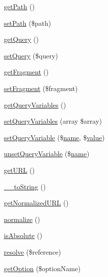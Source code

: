 \begin{DoxyCompactItemize}
\item 
\hyperlink{classNet__URL2_a1c14da4e4da398c69ab0efcc80b183d2}{get\+Path} ()
\item 
\hyperlink{classNet__URL2_aa893e3c250be4842cf21dc6aed0f46b0}{set\+Path} (\$path)
\item 
\hyperlink{classNet__URL2_ab65997a75dae3ef237c80b57da4467f6}{get\+Query} ()
\item 
\hyperlink{classNet__URL2_a8ef0c4583fcbc47e980f5facadc96295}{set\+Query} (\$query)
\item 
\hyperlink{classNet__URL2_a4a72ed5275b63c5cc600a74ec33aa76c}{get\+Fragment} ()
\item 
\hyperlink{classNet__URL2_ac2b9fbed981333efd7cab6c42e47bc04}{set\+Fragment} (\$fragment)
\item 
\hyperlink{classNet__URL2_a92231f88e82f0551c1958af40f7cb88d}{get\+Query\+Variables} ()
\item 
\hyperlink{classNet__URL2_a2b93dbf912e578998c7447788400cc07}{set\+Query\+Variables} (array \$array)
\item 
\hyperlink{classNet__URL2_a30d2d35e20ee1391db08c5ab74ffb262}{set\+Query\+Variable} (\$\hyperlink{common_8js_a22c29d2aa8ed6161ce8faa718ef76e68}{name}, \$\hyperlink{common_2js_2jquery_8js_abe5393d870043cf6aaa1d5ad5fce755c}{value})
\item 
\hyperlink{classNet__URL2_a2841fc0817045ec33688490613d6e64c}{unset\+Query\+Variable} (\$\hyperlink{common_8js_a22c29d2aa8ed6161ce8faa718ef76e68}{name})
\item 
\hyperlink{classNet__URL2_a77d3197589861087e09db160a78c7ee1}{get\+U\+RL} ()
\item 
\hyperlink{classNet__URL2_ad3c022a53765e85dfc5b0cab01a09e03}{\+\_\+\+\_\+to\+String} ()
\item 
\hyperlink{classNet__URL2_ad52ea9577f6cf9ecc712e29498b686d4}{get\+Normalized\+U\+RL} ()
\item 
\hyperlink{classNet__URL2_a1bde4a2650383694a88eb2f1f061fbc4}{normalize} ()
\item 
\hyperlink{classNet__URL2_adfb0cbaed0f947990271d8df410854e2}{is\+Absolute} ()
\item 
\hyperlink{classNet__URL2_a8630ab79fad624b2fd5b0df2e9123c0a}{resolve} (\$reference)
\item 
\hyperlink{classNet__URL2_a4da2891e3eac1700940ae6cf483a0dd3}{get\+Option} (\$option\+Name)
\end{DoxyCompactItemize}
